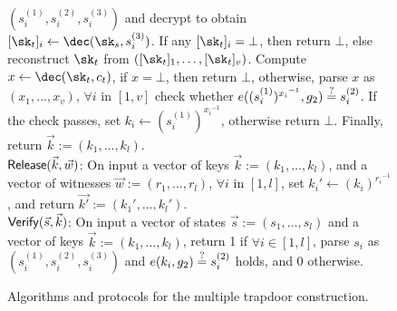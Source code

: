 \begin{figure*}[htb]
\begin{center}
{\begin{minipage}[t]{0.75\textwidth}
			$(s_i^{(1)}, s_i^{(2)}, s_i^{(3)})$ and decrypt to obtain $[\sk_t]_i \gets 
			\dec(\sk_s, s_i^{(3)})$. If any $[\sk_t]_i = \bot$, then return $\bot$, else reconstruct 
			$\sk_t$ from $([\sk_t]_1,\ldots,[\sk_t]_v)$. Compute $x \gets \dec(\sk_t, c_t)$, if $x = \bot$, then 
			return $\bot$, otherwise, parse $x$ as $(x_1,\ldots,x_v)$, $\forall i$ in $[1,v]$ check whether 
			$e((s_i^{(1)})^{{x_i}^{-1}}, g_2) \stackrel{?}{=} s_i^{(2)}$. If the check passes, set 
			$k_i \gets (s_i^{(1)})^{{x_i}^{-1}}$, otherwise return $\bot$. Finally, return $\vec{k} := 
			(k_1,\ldots,k_l)$. \\
			\underline{$\mathsf{Release}(\vec{k}, \vec{w})$}: On input a vector of keys $\vec{k} := (k_1,\ldots,k_l)$, 
			and a vector of witnesses $\vec{w} := (r_1,\ldots,r_l)$, $\forall i$ in $[1,l]$, set $k_i' \gets 
			(k_i)^{{r_i}^{-1}}$, and return $\vec{k'} := (k_1',\ldots,k_l')$. \\
			\underline{$\mathsf{Verify}(\vec{s}, \vec{k})$}: On input a vector of states $\vec{s} := (s_1,\ldots,
			s_l)$ and a vector of keys $\vec{k} := (k_1,\ldots,k_l)$, return 1 if $\forall i \in [1,l]$, 
			parse $s_i$ as $(s_i^{(1)}, s_i^{(2)}, s_i^{(3)})$ and $e(k_i, g_2) \stackrel{?}{=} s_i^{(2)}$ holds, and 
			0 otherwise.
		\end{minipage}
	}
	\end{center}
	
	\caption{Algorithms and protocols for the multiple trapdoor construction.}
	\label{fig:multi-trapdoor}
\end{figure*}
